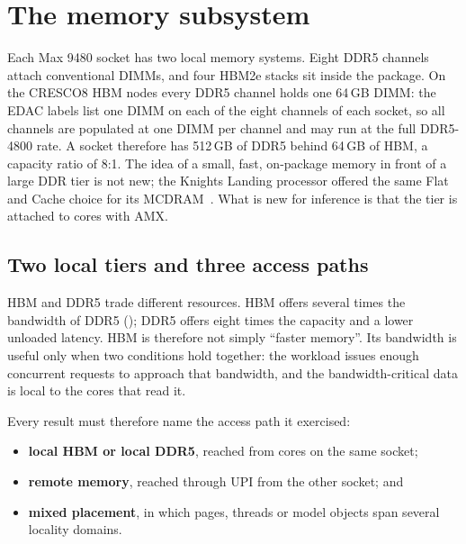 
\section{The memory subsystem}
\label{sec:xeon-max-platform}

Each Max 9480 socket has two local memory systems.  Eight DDR5 channels
attach conventional DIMMs, and four HBM2e stacks sit inside the package.
On the CRESCO8 HBM nodes every DDR5 channel holds one 64\,GB DIMM: the
EDAC labels list one DIMM on each of the eight channels of each socket,
so all channels are populated at one DIMM per channel and may run at the
full DDR5-4800 rate.  A socket therefore has 512\,GB of DDR5 behind
64\,GB of HBM, a capacity ratio of 8:1.  The idea of a small,
fast, on-package memory in front of a large DDR tier is not new; the
Knights Landing processor offered the same Flat and Cache choice for its
MCDRAM~\cite{peng2017hybridmemory}.  What is new for inference is that
the tier is attached to cores with AMX.

\subsection{Two local tiers and three access paths}
\label{sec:memory-hierarchy}

HBM and DDR5 trade different resources.  HBM offers several times the
bandwidth of DDR5 (); DDR5 offers eight times
the capacity and a lower unloaded latency.  HBM is therefore not simply
``faster memory''.  Its bandwidth is useful only when two conditions
hold together: the workload issues enough concurrent requests to
approach that bandwidth, and the bandwidth-critical data is local to the
cores that read it.

Every result must therefore name the access path it exercised:

\begin{itemize}
  \item \textbf{local HBM or local DDR5}, reached from cores on the same
        socket;
  \item \textbf{remote memory}, reached through UPI from the other
        socket; and
  \item \textbf{mixed placement}, in which pages, threads or model
        objects span several locality domains.
\end{itemize}

